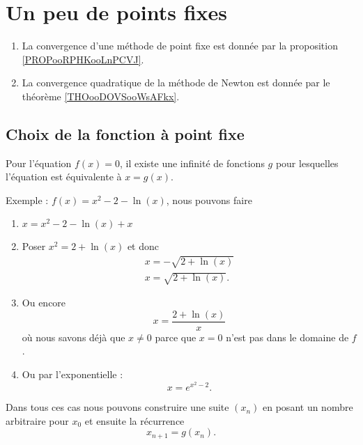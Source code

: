 \section{Un peu de points fixes}

\begin{InternalLinks}
    \begin{enumerate}
        \item
            La convergence d'une méthode de point fixe est donnée par la proposition \ref{PROPooRPHKooLnPCVJ}.
        \item
            La convergence quadratique de la méthode de Newton est donnée par le théorème \ref{THOooDOVSooWsAFkx}.
    \end{enumerate}
\end{InternalLinks}

\subsection{Choix de la fonction à point fixe}

Pour l'équation \( f(x)=0\), il existe une infinité de fonctions \( g\) pour lesquelles l'équation est équivalente à \( x=g(x)\).

Exemple : \( f(x)=x^2-2-\ln(x)\), nous pouvons faire
\begin{enumerate}
    \item
        \( x=x^2-2-\ln(x)+x\)
    \item
        Poser \( x^2=2+\ln(x)\) et donc
        \begin{subequations}
            \begin{align}
                x=-\sqrt{2+\ln(x)}\\
                x=\sqrt{2+\ln(x)}.
            \end{align}
        \end{subequations}
    \item
        Ou encore 
        \begin{equation}
            x=\frac{ 2+\ln(x) }{ x }
        \end{equation}
        où nous savons déjà que \( x\neq 0\) parce que \( x=0\) n'est pas dans le domaine de \( f\).
    \item
        Ou par l'exponentielle :
        \begin{equation}
            x= e^{x^2-2}.
        \end{equation}
\end{enumerate}
Dans tous ces cas nous pouvons construire une suite \( (x_n)\) en posant un nombre arbitraire pour \( x_0\) et ensuite la récurrence 
\begin{equation}
    x_{n+1}=g(x_n).
\end{equation}


